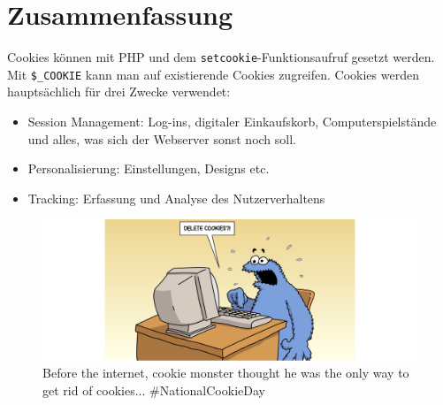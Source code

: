 \section{Zusammenfassung}

Cookies können mit \ac{PHP} und dem \lstinline{setcookie}-Funktionsaufruf gesetzt werden. Mit \lstinline{$_COOKIE} kann man auf existierende Cookies zugreifen. Cookies werden hauptsächlich für drei Zwecke verwendet:

\begin{itemize}
	\item Session Management: Log-ins, digitaler Einkaufskorb, Computerspielstände und alles, was sich der Webserver sonst noch  soll.
	\item Personalisierung: Einstellungen, Designs etc.
	\item Tracking: Erfassung und Analyse des Nutzerverhaltens 
\end{itemize}

\begin{figure}[htb]
\centering
\includegraphics[scale=0.3]{cookie_monster}
\caption*{Before the internet, cookie monster thought he was the only way to get rid of cookies... \#NationalCookieDay}
\end{figure}